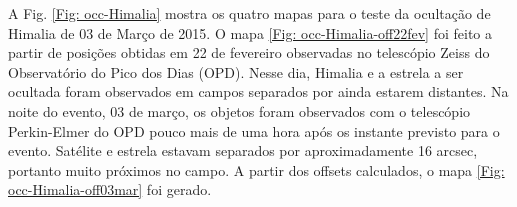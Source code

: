 \documentclass[12pt,a4paper]{monografia}
\begin{document}
A Fig. \ref{Fig: occ-Himalia} mostra os quatro mapas para o teste da ocultação de Himalia de 03 de Março de 2015. O mapa \ref{Fig: occ-Himalia-off22fev} foi feito a partir de posições obtidas em 22 de fevereiro observadas no telescópio Zeiss do Observatório do Pico dos Dias (OPD). Nesse dia, Himalia e a estrela a ser ocultada foram observados em campos separados por ainda estarem distantes. Na noite do evento, 03 de março, os objetos foram observados com o telescópio Perkin-Elmer do OPD pouco mais de uma hora após os instante previsto para o evento. Satélite e estrela estavam separados por aproximadamente 16 arcsec, portanto muito próximos no campo. A partir dos offsets calculados, o mapa \ref{Fig: occ-Himalia-off03mar} foi gerado.

\begin{figure}
\begin{centering}

\end{centering}
\end{figure}
\end{document}
